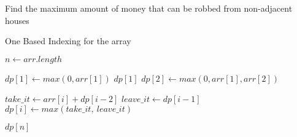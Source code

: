 \documentclass[12pt]{article}
\begin{document}
\begin{algorithm}

  \caption{Find the maximum amount of money that can be robbed from non-adjacent houses}
\begin{algorithmic}[1]
    \Ensure One Based Indexing for the array
    \Statex
    
    
        
        \Statex
        \State $n \gets arr.length$
        
        
        \State $dp[1] \gets max(0,arr[1])$
        \Statex
        \State \Return $dp[1]$
        \EndIf
        \Statex
        \State $dp[2] \gets max(0,arr[1],arr[2])$
        
        
            \State $take\_it \gets arr[i] + dp[i-2]$
            \State $leave\_it \gets dp[i-1]$
            \State $dp[i] \gets max(take\_it, \ leave\_it)$
        \EndFor
        
        \Statex
        
        \State \Return $dp[n]$
        
    \EndFunction
  \end{algorithmic}
  
\end{algorithm}
\end{document}
